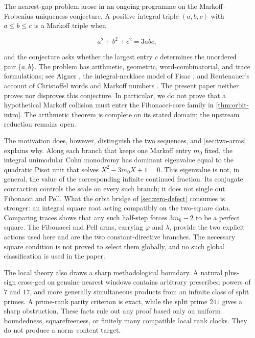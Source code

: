 The nearest-gap problem arose in an ongoing programme on the
Markoff--Frobenius uniqueness conjecture. A positive integral triple
$(a,b,c)$ with $a\leqslant b\leqslant c$ is a Markoff triple when

\begin{equation}
 a^2+b^2+c^2=3abc,
 \label{eq:markoff-equation}
\end{equation}

and the conjecture asks whether the largest entry $c$ determines the
unordered pair $\{a,b\}$. The problem has arithmetic, geometric,
word-combinatorial, and trace formulations; see Aigner \cite{Aigner2013}, the
integral-necklace model of Fisac \cite{Fisac2025}, and Reutenauer's account
of Christoffel words and Markoff numbers \cite{Reutenauer2026}. The present
paper neither proves nor disproves this conjecture. In particular, we do not
prove that a hypothetical Markoff collision must enter the Fibonacci-core
family in \cref{thm:orbit-intro}. The arithmetic theorem is complete on its
stated domain; the upstream reduction remains open.

The motivation does, however, distinguish the two sequences, and
\cref{sec:two-arms} explains why. Along each branch that keeps one Markoff
entry $m_0$ fixed, the integral unimodular Cohn monodromy has dominant
eigenvalue equal to the quadratic Pisot unit that solves
$X^2-3m_0X+1=0$. This eigenvalue is not, in general, the value of the
corresponding infinite continued fraction. Its conjugate contraction controls
the scale on every such branch; it does not single out Fibonacci and Pell.
What the orbit bridge of \cref{sec:zero-defect} consumes is stronger: an
integral square root acting compatibly on the two-square data. Comparing
traces shows that any such half-step forces $3m_0-2$ to be a perfect square.
The Fibonacci and Pell arms, carrying $\varphi$ and $\lambda$, provide the two
explicit actions used here and are the two constant-directive branches. The
necessary square condition is not proved to select them globally, and no such
global classification is used in the paper.

The local theory also draws a sharp methodological boundary. A natural
plus-sign cross-gcd on genuine nearest windows contains arbitrary prescribed
powers of $7$ and $17$, and more generally simultaneous products from an
infinite class of split primes. A prime-rank parity criterion is exact, while
the split prime $241$ gives a sharp obstruction. These facts rule out any
proof based only on uniform boundedness, squarefreeness, or finitely many
compatible local rank clocks. They do not produce a norm--content target.

